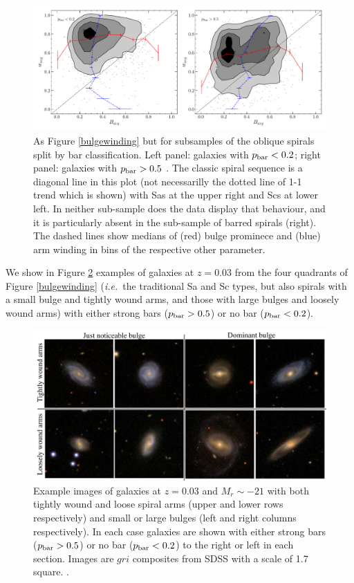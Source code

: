 \documentclass[usenatbib]{mn2e}
\newcommand{\ie}{{\it i.e.}}
\begin{document}
 \begin{figure}
\includegraphics[width=160mm]{bulge_armwinding_split_bar_rolling_median.pdf}
\caption{As Figure \ref{bulgewinding} but for subsamples of the oblique spirals split by bar classification.  Left panel: galaxies with $p_{\rm bar} < 0.2$; right panel: galaxies with $p_{\rm bar} > 0.5$ \label{bars}. The classic spiral sequence is a diagonal line in this plot (not necessarilly the dotted line of 1-1 trend which is shown) with Sas at the upper right and Scs at lower left. In neither sub-sample does the data display that behaviour, and it is particularly absent in the sub-sample of barred spirals (right). The dashed lines show medians of (red) bulge prominece and (blue) arm winding in bins of the respective other parameter.  }
\end{figure}

 We show in Figure \ref{windingexample} examples of galaxies at $z=0.03$ from the four quadrants of Figure \ref{bulgewinding} (\ie ~the traditional Sa and Sc types, but also spirals with a small bulge and tightly wound arms, and those with large bulges and loosely wound arms) with either strong bars ($p_{\rm bar}>0.5$) or no bar ($p_{\rm bar} < 0.2$). 
 
 \begin{figure}
\center
\includegraphics[width=160mm]{examplebulgewinding3.png}
\caption{Example images of galaxies at $z=0.03$ and $M_r\sim -21$ with both tightly wound and loose spiral arms (upper and lower rows respectively) and small or large bulges (left and right columns respectively). In each case galaxies are shown with either strong bars ($p_{\rm bar}>0.5$) or no bar ($p_{\rm bar} < 0.2$) to the right or left in each section. Images are $gri$ composites from SDSS with a scale of 1.7\arcmin~ square.  \label{windingexample}.}
\end{figure}
 
\end{document}
